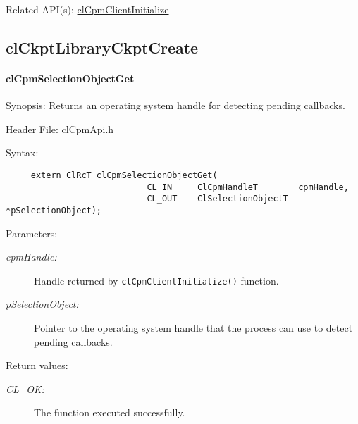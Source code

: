 {\begin{Desc}
\item[Related API(s):]\hyperlink{group__group14}{cl\-Cpm\-Client\-Initialize} \end{Desc}
\newpage






\subsection{clCkptLibraryCkptCreate}
\hypertarget{pagecpm110}{}\paragraph{cl\-Cpm\-Selection\-Object\-Get}\label{pagecpm110}
\begin{Desc}
\item[Synopsis:]Returns an operating system handle for detecting pending callbacks.\end{Desc}
\begin{Desc}
\item[Header File:]clCpmApi.h\end{Desc}
\begin{Desc}
\item[Syntax:]

\footnotesize\begin{verbatim}     extern ClRcT clCpmSelectionObjectGet(
                			CL_IN     ClCpmHandleT        cpmHandle,
                			CL_OUT    ClSelectionObjectT  *pSelectionObject);
\end{verbatim}
\normalsize
\end{Desc}
\begin{Desc}
\item[Parameters:]
\begin{description}
\item[{\em cpm\-Handle:}]Handle returned by {\tt{cl\-Cpm\-Client\-Initialize()}} function. 
\item[{\em p\-Selection\-Object:}]Pointer to the operating system handle that the process can use to detect pending callbacks.
\end{description}
\end{Desc}
\begin{Desc}
\item[Return values:]
\begin{description}
\item[{\em CL\_\-OK:}]The function executed successfully.\end{description}
\end{Desc}

}
